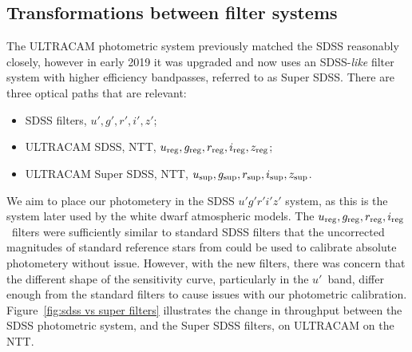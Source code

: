 \subsection{Transformations between filter systems}
\label{sect:observations:colour correction method}

The ULTRACAM photometric system previously matched the SDSS reasonably closely, however in early 2019 it was upgraded and now uses an SDSS-\emph{like} filter system with higher efficiency bandpasses, referred to as Super SDSS. There are three optical paths that are relevant:
\begin{itemize}
\item SDSS filters, $u', g', r', i', z'$;
\item ULTRACAM SDSS, NTT, $u_{\rm reg}, g_{\rm reg}, r_{\rm reg}, i_{\rm reg}, z_{\rm reg}$;
\item ULTRACAM Super SDSS,  NTT, $u_{\rm sup}, g_{\rm sup}, r_{\rm sup}, i_{\rm sup}, z_{\rm sup}$.
\end{itemize}

We aim to place our photometery in the SDSS $u'g'r'i'z'$ system, as this is the system later used by the white dwarf atmospheric models. The $u_{\rm reg}, g_{\rm reg}, r_{\rm reg}, i_{\rm reg}$\ filters were sufficiently similar to standard SDSS filters that the uncorrected magnitudes of standard reference stars from \citet{smith2002} could be used to calibrate absolute photometery without issue. However, with the new filters, there was concern that the different shape of the sensitivity curve, particularly in the $u'$\ band, differ enough from the standard filters to cause issues with our photometric calibration. Figure~\ref{fig:sdss vs super filters} illustrates the change in throughput between the SDSS photometric system, and the Super SDSS filters, on ULTRACAM on the NTT. 

